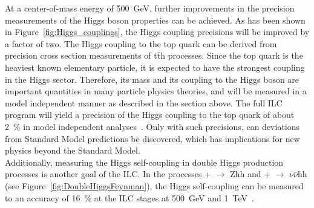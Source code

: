 At a center-of-mass energy of \SI{500}{\GeV}, further improvements in the precision measurements of the Higgs boson properties can be achieved.
As has been shown in Figure~\ref{fig:Higgs_couplings}, the Higgs coupling precisions will be improved by a factor of two.
The Higgs coupling to the top quark can be derived from precision cross section measurements of t$\bar{\mathrm{t}}$h processes.
Since the top quark is the heaviest known elementary particle, it is expected to have the strongest coupling in the Higgs sector.
Therefore, its mass and its coupling to the Higgs boson are important quantities in many particle physics theories, and will be measured in a model independent manner as described in the section above.
The full ILC program will yield a precision of the Higgs coupling to the top quark of about \SI{2}{\percent} in model independent analyses~\cite{ttH_coupling}.
Only with such precisions, can deviations from Standard Model predictions be discovered, which has implications for new physics beyond the Standard Model.
\\Additionally, measuring the Higgs self-coupling in double Higgs production processes is another goal of the ILC.
In the processes \positron + \electron $\rightarrow$ Zhh and \positron + \electron$ \rightarrow$  $\nu\bar{\nu}$hh (see Figure~\ref{fig:DoubleHiggsFeynman}), the Higgs self-coupling can be measured to an accuracy of \SI{16}{\percent} at the ILC stages at \SI{500}{\GeV} and \SI{1}{\TeV}~\cite{ttH_coupling}.
